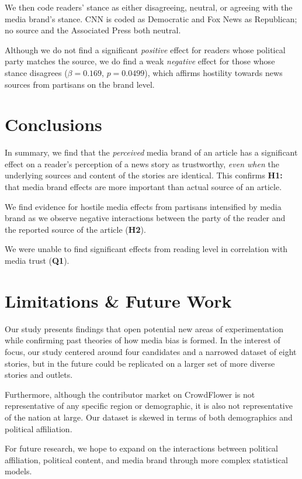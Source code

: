  We then code readers' stance as either disagreeing, neutral, or agreeing with the media brand's stance. CNN is coded as Democratic and Fox News as Republican; no source and the Associated Press both neutral.

Although we do not find a significant \emph{positive} effect for readers whose political party matches the source, we do find a weak \emph{negative} effect for those whose stance disagrees ($\beta=0.169$, $p=0.0499$), which affirms hostility towards news sources from partisans on the brand level.  
 

\section{Conclusions}
In summary, we find that the \emph{perceived} media brand of an article has a significant effect on a reader's perception of a news story as trustworthy, \emph{even when} the underlying sources and content of the stories are identical. This confirms \textbf{H1:} that media brand effects are more important than actual source of an article. 

We find evidence for hostile media effects from partisans intensified by media brand as we observe negative interactions between the party of the reader and the reported source of the article (\textbf{H2}).

We were unable to find significant effects from reading level in correlation with media trust (\textbf{Q1}).


\section{Limitations \& Future Work}

Our study presents findings that open potential new areas of experimentation while confirming past theories of how media bias is formed. In the interest of focus, our study centered around four candidates and a narrowed dataset of eight stories, but in the future could be replicated on a larger set of more diverse stories and outlets. 

Furthermore, although the contributor market on CrowdFlower is not representative of any specific region or demographic, it is also not representative of the nation at large. Our dataset is skewed in terms of both demographics and political affiliation.

For future research, we hope to expand on the interactions between political affiliation, political content, and media brand through more complex statistical models.
